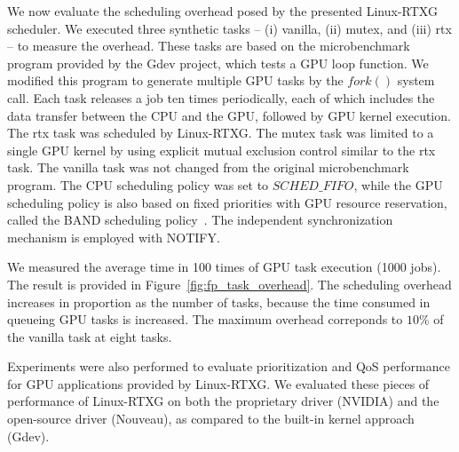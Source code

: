 We now evaluate the scheduling overhead posed by the presented
Linux-RTXG scheduler.
We executed three synthetic tasks -- (i) vanilla, (ii) mutex, and (iii)
rtx -- to measure the overhead. 
These tasks are based on the microbenchmark program provided by the Gdev
project, which tests a GPU loop function.
We modified this program to generate multiple GPU tasks by the $fork()$
system call.
Each task releases a job ten times periodically, each of which includes
the data transfer between the CPU and the GPU, followed by GPU kernel
execution.
The rtx task was scheduled by Linux-RTXG.
The mutex task was limited to a single GPU kernel by using explicit
mutual exclusion control similar to the rtx task.
The vanilla task was not changed from the original microbenchmark
program.
The CPU scheduling policy was set to $SCHED\_FIFO$, while the GPU
scheduling policy is also based on fixed priorities with GPU resource
reservation, called the BAND scheduling policy~\cite{kato:gdev}.
The independent synchronization mechanism is employed with NOTIFY.

We measured the average time in 100 times of GPU task execution (1000 jobs).
The result is provided in Figure~\ref{fig:fp_task_overhead}.
The scheduling overhead increases in proportion as the number of tasks,
because the time consumed in queueing GPU tasks is increased. 
The maximum overhead correponds to $10\%$ of the vanilla task at eight
tasks.

Experiments were also performed to evaluate prioritization and QoS
performance for GPU applications provided by Linux-RTXG.
We evaluated these pieces of performance of Linux-RTXG on both the
proprietary driver (NVIDIA) and the open-source driver (Nouveau), as
compared to the built-in kernel approach (Gdev).

